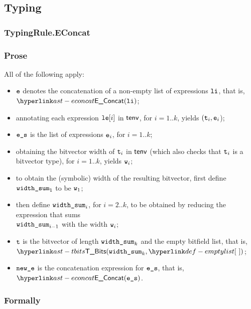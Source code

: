 \subsection{Typing}
\subsubsection{TypingRule.EConcat \label{sec:TypingRule.EConcat}}
\subsubsection{Prose}
All of the following apply:
\begin{itemize}
  \item $\ve$ denotes the concatenation of a non-empty list of expressions $\vli$, that is, \\ $\EConcat(\vli)$;
  \item annotating each expression $\vle[i]$ in $\tenv$, for $i=1..k$, yields $(\vt_i, \ve_i$)\ProseOrTypeError;
  \item $\ves$ is the list of expressions $\ve_i$, for $i=1..k$;
  \item obtaining the bitvector width of $\vt_i$ in $\tenv$ (which also checks that $\vt_i$ is a bitvector type),
        for $i=1..k$, yields $\vw_i$\ProseOrTypeError;
  \item to obtain the (symbolic) width of the resulting bitvector, first define $\widthsum_1$ to be $\vw_1$;
  \item then define $\widthsum_i$, for $i=2..k$, to be obtained by reducing the expression that sums \\ $\widthsum_{i-1}$ with the width $\vw_i$;
  \item $\vt$ is the bitvector of length $\widthsum_k$ and the empty bitfield list, that is, \\ $\TBits(\widthsum_k, \emptylist)$;
  \item $\newe$ is the concatenation expression for $\ves$, that is, $\EConcat(\ves)$.
\end{itemize}
\subsubsection{Formally}
\begin{mathpar}
\end{mathpar}

